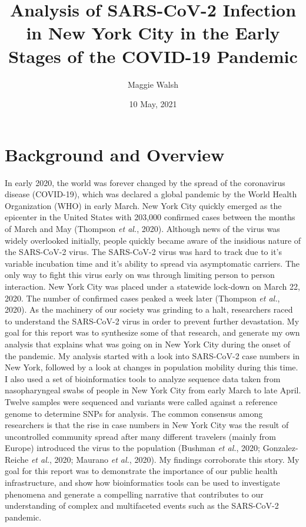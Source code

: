 \documentclass[
]{article}
\title{Analysis of SARS-CoV-2 Infection in New York City in the Early
Stages of the COVID-19 Pandemic}
\author{Maggie Walsh}
\date{10 May, 2021}
\begin{document}
\maketitle

\hypertarget{background-and-overview}{%
\section{Background and Overview}\label{background-and-overview}}

In early 2020, the world was forever changed by the spread of the
coronavirus disease (COVID-19), which was declared a global pandemic by
the World Health Organization (WHO) in early March. New York City
quickly emerged as the epicenter in the United States with 203,000
confirmed cases between the months of March and May (Thompson \emph{et
al.}, 2020). Although news of the virus was widely overlooked initially,
people quickly became aware of the insidious nature of the SARS-CoV-2
virus. The SARS-CoV-2 virus was hard to track due to it's variable
incubation time and it's ability to spread via asymptomatic carriers.
The only way to fight this virus early on was through limiting person to
person interaction. New York City was placed under a statewide lock-down
on March 22, 2020. The number of confirmed cases peaked a week later
(Thompson \emph{et al.}, 2020). As the machinery of our society was
grinding to a halt, researchers raced to understand the SARS-CoV-2 virus
in order to prevent further devastation. My goal for this report was to
synthesize some of that research, and generate my own analysis that
explains what was going on in New York City during the onset of the
pandemic. My analysis started with a look into SARS-CoV-2 case numbers
in New York, followed by a look at changes in population mobility during
this time. I also used a set of bioinformatics tools to analyze sequence
data taken from nasopharyngeal swabs of people in New York City from
early March to late April. Twelve samples were sequenced and variants
were called against a reference genome to determine SNPs for analysis.
The common consensus among researchers is that the rise in case numbers
in New York City was the result of uncontrolled community spread after
many different travelers (mainly from Europe) introduced the virus to
the population (Bushman \emph{et al.}, 2020; Gonzalez-Reiche \emph{et
al.}, 2020; Maurano \emph{et al.}, 2020). My findings corroborate this
story. My goal for this report was to demonstrate the importance of our
public health infrastructure, and show how bioinformatics tools can be
used to investigate phenomena and generate a compelling narrative that
contributes to our understanding of complex and multifaceted events such
as the SARS-CoV-2 pandemic.
\end{document}
